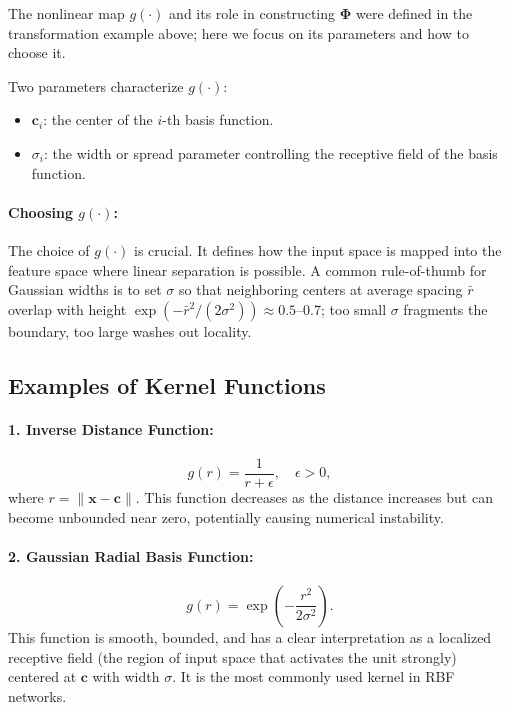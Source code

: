 The nonlinear map \(g(\cdot)\) and its role in constructing \(\boldsymbol{\Phi}\) were defined in the transformation example above; here we focus on its parameters and how to choose it.

Two parameters characterize \(g(\cdot)\):
\begin{itemize}
    \item \(\mathbf{c}_i\): the center of the \(i\)-th basis function.
    \item \(\sigma_i\): the width or spread parameter controlling the receptive field of the basis function.
\end{itemize}

\paragraph{Choosing \(g(\cdot)\):} The choice of \(g(\cdot)\) is crucial. It defines how the input space is mapped into the feature space where linear separation is possible. A common rule-of-thumb for Gaussian widths is to set \(\sigma\) so that neighboring centers at average spacing \(\bar{r}\) overlap with height \(\exp(-\bar{r}^2/(2\sigma^2))\approx 0.5\)--0.7; too small \(\sigma\) fragments the boundary, too large washes out locality.

\subsection{Examples of Kernel Functions}
\label{sec:rbf_examples_of_kernel_functions}

\paragraph{1. Inverse Distance Function:}
\[
g(r) = \frac{1}{r + \epsilon}, \quad \epsilon > 0,
\]
where \(r = \|\mathbf{x} - \mathbf{c}\|\). This function decreases as the distance increases but can become unbounded near zero, potentially causing numerical instability.

\paragraph{2. Gaussian Radial Basis Function:}
\[
g(r) = \exp\left(-\frac{r^2}{2\sigma^2}\right).
\]
This function is smooth, bounded, and has a clear interpretation as a localized receptive field (the region of input space that activates the unit strongly) centered at \(\mathbf{c}\) with width \(\sigma\). It is the most commonly used kernel in RBF networks.


